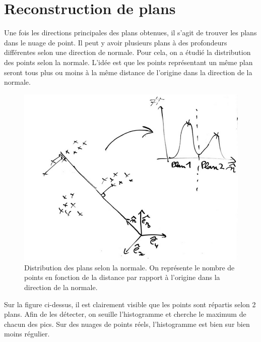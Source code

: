 \documentclass{article}
\begin{document}
\section{Reconstruction de plans}

Une fois les directions principales des plans obtenues, il s'agit de trouver les plans dans le nuage de point. Il peut y avoir plusieurs plans à des profondeurs différentes selon une direction de normale. Pour cela, on a étudié la distribution des points selon la normale. L'idée est que les points représentant un même plan seront tous plus ou moins à la même distance de l'origine dans la direction de la normale.

\begin{figure}[H]
\centering
\includegraphics[width=.7\textwidth]{../normal_to_hist.png}
\caption{Distribution des plans selon la normale. On représente le nombre de points en fonction de la distance par rapport à l'origine dans la direction de la normale.}
\end{figure}


Sur la figure ci-dessus, il est clairement visible que les points sont répartis selon 2 plans. Afin de les détecter, on seuille l'histogramme et cherche le maximum de chacun des pics. Sur des nuages de points réels, l'histogramme est bien sur bien moins régulier.
\end{document}
